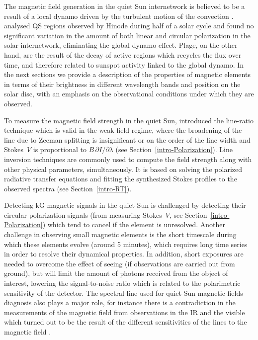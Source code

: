 \documentclass[goettingen, gauss, print]{thesis}
\begin{document}

The magnetic field generation in the quiet Sun internetwork is believed to be a result of a local dynamo driven by the turbulent motion of the convection \citep{vogler_solar_2007, danilovic_probing_2010, buehler_quiet_2013, lites_solar_2014}. \cite{buehler_quiet_2013} analysed QS regions observed by Hinode during half of a solar cycle and found no significant variation in the amount of both linear and circular polarization in the solar internetwork, eliminating the global dynamo effect. Plage, on the other hand, are the result of the decay of active regions which recycles the flux over time, and therefore related to sunspot activity linked to the global dynamo.
In the next sections we provide a description of the properties of magnetic elements in terms of their brightness in different wavelength bands and position on the solar disc, with an emphasis on the observational conditions under which they are observed.

To measure the magnetic field strength in the quiet Sun, \cite{stenflo_magnetic-field_1973} introduced the line-ratio technique which is valid in the weak field regime, where the broadening of the line due to Zeeman splitting is insignificant or on the order of the line width and Stokes~$V$ is proportional to $B \,\partial I/\partial \lambda$ (see Section~\ref{intro-Polarization}). 
Line inversion techniques are commonly used to compute the field strength along with other physical parameters, simultaneously. It is based on solving the polarized radiative transfer equations and fitting the synthesized Stokes profiles to the observed spectra (see Section~\ref{intro-RT}).

Detecting kG magnetic signals in the quiet Sun is challenged by detecting their circular polarization signals (from measuring Stokes~$V$, see Section~\ref{intro-Polarization}) which tend to cancel if the element is unresolved. Another challenge in observing small magnetic elements is the short timescale during which these elements evolve (around 5 minutes), which requires long time series in order to resolve their dynamical properties. In addition, short exposures are needed to overcome the effect of seeing (if observations are carried out from ground), but will limit the amount of photons received from the object of interest, lowering the signal-to-noise ratio which is related to the polarimetric sensitivity of the detector.
The spectral line used for quiet-Sun magnetic fields diagnosis also plays a major role, for instance there is a contradiction in the  measurements of the magnetic field from observations in the IR and the visible which turned out to be the result of the different sensitivities of the lines to the magnetic field \citep{sanchez_almeida_physical_2000}.
\end{document}
